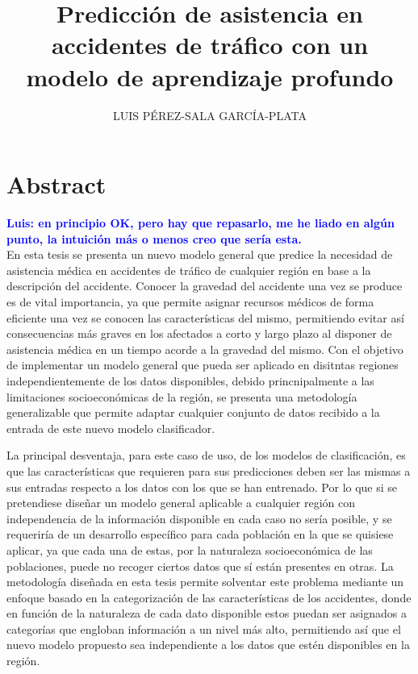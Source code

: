 \documentclass{uathesis-es}
\title{Predicción de asistencia en accidentes de tráfico con un modelo de aprendizaje profundo}
\author{LUIS PÉREZ-SALA GARCÍA-PLATA}
\begin{document}
\maketitle

\tableofcontents



\section{Abstract}

\textcolor{blue}{\textbf{Luis: en principio OK, pero hay que repasarlo, me he liado en algún punto, la intuición más o menos creo que sería esta.}}\\

En esta tesis se presenta un nuevo modelo general que predice la necesidad de asistencia médica en accidentes de tráfico de cualquier región en base a la descripción del accidente. Conocer la gravedad del accidente una vez se produce es de vital importancia, ya que permite asignar recursos médicos de forma eficiente una vez se conocen las características del mismo, permitiendo evitar así consecuencias más graves en los afectados a corto y largo plazo al disponer de asistencia médica en un tiempo acorde a la gravedad del mismo. Con el objetivo de implementar un modelo general que pueda ser aplicado en disitntas regiones independientemente de los datos disponibles, debido princnipalmente a las limitaciones socioeconómicas de la región, se presenta una metodología generalizable que permite adaptar cualquier conjunto de datos recibido a la entrada de este nuevo modelo clasificador.

La principal desventaja, para este caso de uso, de los modelos de clasificación, es que las características que requieren para sus predicciones deben ser las mismas a sus entradas respecto a los datos con los que se han entrenado. Por lo que si se pretendiese diseñar un modelo general aplicable a cualquier región con independencia de la información disponible en cada caso no sería posible, y se requeriría de un desarrollo específico para cada población en la que se quisiese aplicar, ya que cada una de estas, por la naturaleza socioeconómica de las poblaciones, puede no recoger ciertos datos que sí están presentes en otras. La metodología diseñada en esta tesis permite solventar este problema mediante un enfoque basado en la categorización de las características de los accidentes, donde en función de la naturaleza de cada dato disponible estos puedan ser asignados a categorías que engloban información a un nivel más alto, permitiendo así que el nuevo modelo propuesto sea independiente a los datos que estén disponibles en la región.
\end{document}
